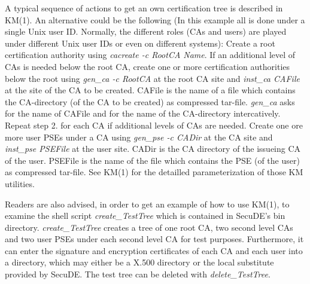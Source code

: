 A typical sequence of actions to get an own certification tree is described in KM(1).
An alternative could be the following (In this example all 
is done under a single Unix user ID. Normally, the different roles (CAs and users) are
played under different Unix user IDs or even on different systems):
\be
\m Create a root certification authority using {\em cacreate -c RootCA Name}.
\m If an additional level of CAs is needed below the root CA, create one or more 
   certification authorities below the root
   using {\em gen\_ca -c RootCA} at the root CA site and {\em inst\_ca CAFile} at the site
   of the CA to be created. CAFile is the name of a file which contains the CA-directory
   (of the CA to be created) as compressed tar-file. {\em gen\_ca} asks for the name of 
   CAFile and for the name of the CA-directory intercatively.
\m Repeat step 2. for each CA if additional levels of CAs are needed.
\m Create one ore more user PSEs under a CA using {\em gen\_pse -c CADir} at the CA site
   and {\em inst\_pse PSEFile} at the user site. CADir is the CA directory of the issueing
   CA of the user. PSEFile is the name of the file which contains the PSE (of the user)
   as compressed tar-file. 
\ee
See KM(1) for the detailled parameterization of those KM utilities.
 
Readers are also advised, in order to get an example of how to use KM(1), to examine the shell 
script {\em create\_TestTree} which is contained in SecuDE's bin directory. 
{\em create\_TestTree} creates a tree of one root CA, two second level CAs and two
user PSEs under each second level CA for test purposes. Furthermore, it can enter
the signature and encryption certificates of each CA and each user into a directory, which 
may either be a X.500 directory or the local substitute provided by SecuDE. The test 
tree can be deleted with {\em delete\_TestTree}.

